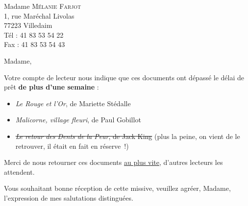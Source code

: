 \documentclass[12pt]{lettre} %
\begin{document}
 \renewcommand*{\labelitemi}{$\bullet$} \renewcommand*{\labelitemii}{$\circ$} \renewcommand*{\labelitemiii}{$\cdot$} \renewcommand*{\labelitemiv}{$\diamond$}

\begin{letter}{%
    Madame \textsc{Mélanie Farjot} \\
    1, rue Maréchal Livolas\\
    77223 Villedaim\\
    Tél : 41 83 53 54 22\\
    Fax : 41 83 53 54 43
                                                                               
}
\address{%
  M. Guillaume \textsc{Grumbold}\\
  42, rue du Cerf\\            
  77444 Trifouilly en Brie}
                                     
                                      
\signature{Guillaume \textsc{Grumbold}}

\pagestyle{empty}
                                                                                          
                               
\opening{}

Madame,

Votre compte de lecteur nous indique que ces documents ont dépassé le délai de prêt \textbf{de plus d'une semaine} :

\begin{itemize}
\item \textit{Le Rouge et l'Or}, de Mariette Stédalle
\item \textit{Malicorne, village fleuri}, de Paul Gobillot
\item \sout{\textit{Le retour des Dents de la Peur}, de Jack King} (plus la peine, on vient de le retrouver, il était en fait en réserve~!)
\end{itemize}

Merci de nous retourner ces documents \underline{au plus vite}, d’autres lecteurs les attendent.

Vous souhaitant bonne réception de cette missive, veuillez agréer, Madame, l'expression de mes salutations distinguées.


\closing{}
\end{letter}
\end{document}

